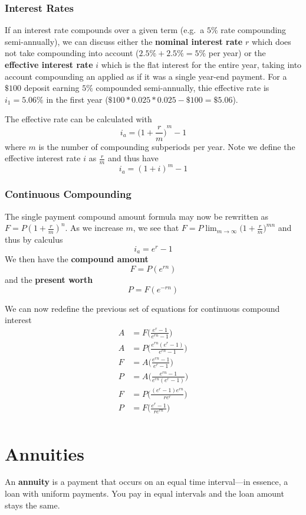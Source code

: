 \documentclass[12pt]{article}
\begin{document}
\subsubsection{Interest Rates}
If an interest rate compounds over a given term (e.g.\ a $5\%$ rate compounding semi-annually), we can discuss either the {\bf nominal interest rate} $r$ which does not take compounding into account ($2.5\% + 2.5\% = 5\%$ per year) or the {\bf effective interest rate} $i$ which is the flat interest for the entire year, taking into account compounding an applied as if it was a single year-end payment. For a $\$100$ deposit earning $5\%$ compounded semi-annually, thie effective rate is $i_1 = 5.06\%$ in the first year ($\$100 * 0.025 * 0.025 - \$100 = \$5.06$).

The effective rate can be calculated with \[ i_a = {\bigg(1 + \frac{r}{m} \bigg)}^m - 1 \] where $m$ is the number of compounding subperiods per year. Note we define the effective interest rate $i$ as $\frac{r}{m}$ and thus have \[ i_a = {(1 + i )}^m - 1 \]

\subsubsection{Continuous Compounding}
The single payment compound amount formula may now be rewritten as $F = P{(1 + \frac{r}{m})}^n$. As we increase $m$, we see that $F = P \displaystyle\lim_{m\to\infty} {\bigg(1 + \frac{r}{m} \bigg)}^{mn}$ and thus by calculus \[ i_a = e^r - 1 \] We then have the {\bf compound amount} \[ F = P(e^{rn}) \] and the {\bf present worth} \[ P = F(e^{-rn}) \]

We can now redefine the previous set of equations for continuous compound interest
\begin{align*}
A &= F \bigg( \frac{e^r - 1}{e^{rn} - 1} \bigg)\\
A &= P \bigg( \frac{e^{rn}(e^r - 1)}{e^{rn} - 1} \bigg)\\
F &= A \bigg( \frac{e^{rn} - 1}{e^r - 1} \bigg)\\
P &= A \bigg( \frac{e^{rn} - 1}{e^{rn}(e^r - 1)} \bigg)\\
F &= P \bigg( \frac{(e^r - 1)e^{rn}}{re^r} \bigg)\\
P &= F \bigg( \frac{e^r - 1}{re^{rn}} \bigg)\\
\end{align*}

\section{Annuities}
An {\bf annuity} is a payment that occurs on an equal time interval---in essence, a loan with uniform payments. You pay in equal intervals and the loan amount stays the same.
\end{document}
